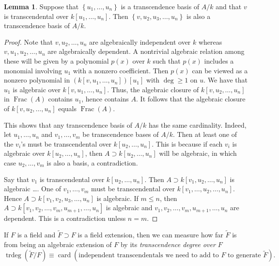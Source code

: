 \documentclass[10pt,letterpaper,cm]{nupset}
\theoremstyle{definition}
\theoremstyle{theorem}
\newtheorem{lemma}[definition]{Lemma}
\theoremstyle{remark}
\newcommand{\1}{\mathbf{1}}
\newcommand{\0}{\vec 0}
\DeclareMathOperator{\card}{\text{card}}
\DeclareMathOperator{\trdeg}{trdeg}
\DeclareMathOperator{\Frac}{Frac}
\begin{document}
\begin{lemma}
Suppose that $\left\{u_1, \ldots, u_n\right\}$ is a transcendence basis of $A/k$ and that $v$ is transcendental over $k[u_1, \ldots, u_n]$. Then $\left\{ v, u_2, u_3, \ldots, u_n \right\}$ is also a transcendence basis of $A/k$.
\end{lemma}
\begin{proof}
Note that $v, u_2, \ldots, u_n$ are algebraically independent over $k$ whereas $v, u_1, u_2, \ldots, u_n$ are algebraically dependent. A nontrivial algebraic relation among these will be given by a polynomial $p(x)$ over $k$ such that $p(x)$ includes a monomial involving $u_1$ with a nonzero coefficient. Then $p(x)$ can be viewed as a nonzero polynomial in $\left(k\left[v, u_1, \ldots, u_n\right]\right)\left[u_1\right]$ with $\deg \geq 1$ on $u$. We have that $u_1$ is algebraic over $k[v, u_1, \ldots, u_n]$. Thus, the algebraic closure of $k[v, u_2, \ldots, u_n]$ in $\Frac(A)$ contains $u_1$, hence contains $A$. It follows that the algebraic closure of $k[v, u_2, \ldots, u_n]$ equals $\Frac(A)$.

\medskip


This shows that any transcendence basis of $A / k$ has the same cardinality. Indeed, let $u_1, \ldots, u_n$ and $v_1, \ldots, v_m$ be transcendence bases of $A/k$. Then at least one of the $v_i$'s must be transcendental over $k[u_2, \ldots, u_n]$. This is because if each $v_i$ is algebraic over $k[u_2, \ldots, u_n]$, then $A \supset k[u_2, \ldots, u_n]$ will be algebraic, in which case $u_2, \ldots, v_m$ is also a basis, a contradiction. 

\medskip


Say that $v_1$ is transcendental over $k[u_2, \ldots, u_n]$. Then $A \supset k[v_1, u_2, \ldots, u_n]$ is algebraic \ldots . One of $v_1, \ldots, v_m$ must be transcendental over $k[v_1, \ldots, u_2, \ldots, u_n]$. Hence $A \supset k[v_1, v_2, u_3, \ldots, u_n]$ is algebraic. If $m \leq n$, then $A \supset k[v_1, v_2, \ldots, v_m, u_{m+1}, \ldots, u_n]$ is algebraic and $v_1, v_2, \ldots, v_m, u_{m+1}, \ldots, u_n$ are dependent. This is a contradiction unless $n=m$. 
\end{proof}

\smallskip

If $F$ is a field and $\widetilde{F}\supset F$ is a field extension, then we can measure how far $\widetilde{F}$ is from being an algebraic extension of $F$ by its \textit{transcendence degree over $F$} $$\trdeg\left(\widetilde{F}/F\right) \equiv  \card(\text{independent transcendentals we need to add to } F \text{ to generate } \widetilde{F}).$$
\end{document}
